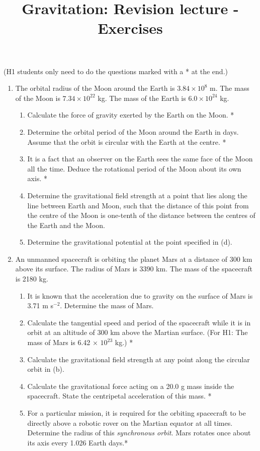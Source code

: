 \documentclass[a4paper,12pt]{article}
\title{Gravitation: Revision lecture - Exercises}
\date{}
\begin{document}
\maketitle

(H1 students only need to do the questions marked with a * at the end.)\\
\begin{enumerate}
\item The orbital radius of the Moon around the Earth is $3.84 × 10^8$ m. The mass of the Moon is $7.34 × 10^{22}$ kg. The mass of the Earth is $6.0 × 10^{24}$ kg. 

\begin{enumerate}
\item Calculate the force of gravity exerted by the Earth on the Moon. *
\item Determine the orbital period of the Moon around the Earth in days. Assume that the orbit is circular with the Earth at the centre. *
\item It is a fact that an observer on the Earth sees the same face of the Moon all the time. Deduce the rotational period of the Moon about its own axis. *
\item Determine the gravitational field strength at a point that lies along the line between Earth and Moon, such that the distance of this point from the centre of the Moon is one-tenth of the distance between the centres of the Earth and the Moon.
\item Determine the gravitational potential at the point specified in (d).
\end{enumerate}

\vspace{1cm}

\item An unmanned spacecraft is orbiting the planet Mars at a distance of 300 km above its surface. The radius of Mars is 3390 km. The mass of the spacecraft is 2180 kg. 

\begin{enumerate}
\item It is known that the acceleration due to gravity on the surface of Mars is 3.71 m s$^{-2}$. Determine the mass of Mars. 
\item Calculate the tangential speed and period of the spacecraft while it is in orbit at an altitude of 300 km above the Martian surface. (For H1: The mass of Mars is 6.42 × $10^{23}$ kg.) *
 \item Calculate the gravitational field strength at any point along the circular orbit in (b). 
\item Calculate the gravitational force acting on a 20.0 g mass inside the spacecraft. State the centripetal acceleration of this mass. *
\item For a particular mission, it is required for the orbiting spacecraft to be directly above a robotic rover on the Martian equator at all times. Determine the radius of this \emph{synchronous orbit}. Mars rotates once about its axis every 1.026 Earth days.* \\ 


\end{enumerate}
\end{enumerate}
\end{document}
